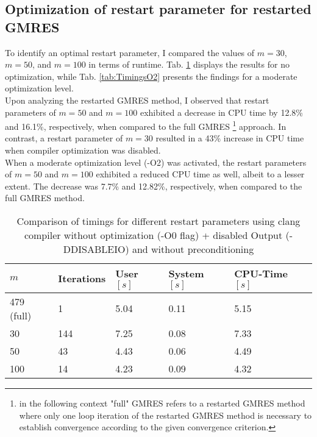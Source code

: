 \documentclass[11pt,a4paper]{article}
\newcommand{\refTab}[1]{Tab. \ref{#1}}
\begin{document}
\subsection{Optimization of restart parameter for restarted GMRES}
To identify an optimal restart parameter, I compared the values of $m=30$, $m=50$, and $m=100$ in terms of runtime. \refTab{tab:TimingsO0} displays the results for no optimization, while \refTab{tab:TimingsO2} presents the findings for a moderate optimization level.\\
%
Upon analyzing the restarted GMRES method, I observed that restart parameters of $m=50$ and $m=100$ exhibited a decrease in CPU time by 12.8\% and 16.1\%, respectively, when compared to the full GMRES \footnote{in the following context "full" GMRES refers to a restarted GMRES method where only one loop iteration of the restarted GMRES method is necessary to establish convergence according to the given convergence criterion.} approach. In contrast, a restart parameter of $m=30$ resulted in a 43\% increase in CPU time when compiler optimization was disabled.\\
%
When a moderate optimization level (-O2) was activated, the restart parameters of $m=50$ and $m=100$ exhibited a reduced CPU time as well, albeit to a lesser extent. The decrease was 7.7\% and 12.82\%, respectively, when compared to the full GMRES method.\\
% 
\renewcommand{\arraystretch}{2}
\begin{table}[h!]
	\begin{center}
		\begin{tabular}{ p{2cm} p{2cm} p{1.5cm} p{1.8cm} p{2.5cm}}
			\hline
			\hline
			$m$ & Iterations & User $[s]$ & System $[s]$ & CPU-Time $[s]$ \\
			\hline
			\hline
			479 (full) & 1 & 5.04 & 0.11 & 5.15\\
			\hline
			\hline
			30 & 144 & 7.25 & 0.08 & 7.33\\
			\hline
			50 & 43 & 4.43 & 0.06 & 4.49\\
			\hline
			100 & 14 & 4.23 & 0.09 & 4.32\\
			\hline
			\hline
		\end{tabular}
		\caption{\label{tab:TimingsO0}  Comparison of timings for different restart parameters using clang compiler without optimization (-O0 flag) + disabled Output (-DDISABLEIO) and without preconditioning}
	\end{center}
\end{table}
\renewcommand{\arraystretch}{1}
\end{document}
